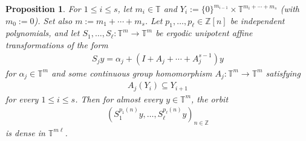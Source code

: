 \documentclass[11pt]{amsart}
\newtheorem{proposition}[lemma]{Proposition}
\theoremstyle{definition}
\newcommand{\T}{{\mathbb T}}
\newcommand{\Z}{{\mathbb Z}}
\newcommand{\1}{{\mathbf{1}}}
\begin{document}
\begin{proposition}\label{P: equidistribution for unipotent affine}
    For $1\leq i\leq s$, let $m_i\in\T$ and $Y_i := \{0\}^{m_{i-1}}\times \T^{m_{i}+ \cdots + m_s}$ (with $m_0:=0$). Set also $m:=m_1 + \cdots + m_s$.
    Let $p_1, \ldots, p_\ell\in\Z[n]$ be independent polynomials, and let $S_1, \ldots, S_\ell:\T^m\to\T^m$ be ergodic unipotent affine transformations of the form
    \begin{align*}
        S_jy = \alpha_j + (I+A_j + \cdots + A_j^{s-1})y
    \end{align*}
    for   $\alpha_{j}\in\T^{m}$ and some continuous group homomorphism $A_j:\T^m\to\T^m$ satisfying
    \begin{align}\label{E: shifting property of A}
     A_j(Y_i)\subseteq Y_{i+1}   
    \end{align}
    for every $1\leq i\leq s$.    
    Then for almost every $y\in\T^m$, the orbit
    \begin{align}%
        (S_1^{p_1(n)}y, \ldots, S_\ell^{p_\ell(n)}y)_{n\in\Z}
    \end{align}
    is dense in $\T^{m\ell}$.
\end{proposition}
\end{document}
